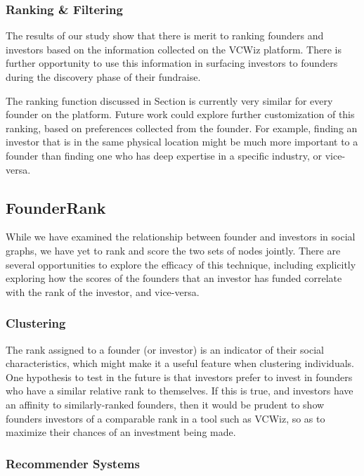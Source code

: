 \subsubsection{Ranking \& Filtering}

The results of our study show that there is merit to ranking founders and investors based on the information collected on the VCWiz platform. There is further opportunity to use this information in surfacing investors to founders during the discovery phase of their fundraise.

The ranking function discussed in Section \label{ch4:filtering} is currently very similar for every founder on the platform. Future work could explore further customization of this ranking, based on preferences collected from the founder. For example, finding an investor that is in the same physical location might be much more important to a founder than finding one who has deep expertise in a specific industry, or vice-versa.

\subsection{FounderRank}

While we have examined the relationship between founder and investors in social graphs, we have yet to rank and score the two sets of nodes jointly. There are several opportunities to explore the efficacy of this technique, including explicitly exploring how the scores of the founders that an investor has funded correlate with the rank of the investor, and vice-versa.

\subsubsection{Clustering}

The rank assigned to a founder (or investor) is an indicator of their social characteristics, which might make it a useful feature when clustering individuals. One hypothesis to test in the future is that investors prefer to invest in founders who have a similar relative rank to themselves. If this is true, and investors have an affinity to similarly-ranked founders, then it would be prudent to show founders investors of a comparable rank in a tool such as VCWiz, so as to maximize their chances of an investment being made.

\subsubsection{Recommender Systems}

